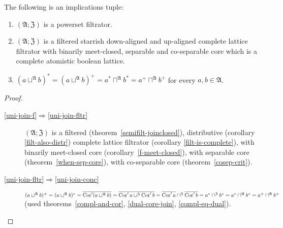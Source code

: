 \begin{thm}
The following is an implications tuple:
\begin{enumerate}
\item \label{uni-join-f}$(\mathfrak{A};\mathfrak{Z})$ is a powerset filtrator.
\item \label{uni-join-fltr}$(\mathfrak{A};\mathfrak{Z})$ is a filtered
starrish down-aligned and up-aligned complete lattice filtrator with binarily meet-closed,
separable and co-separable core which is a complete atomistic boolean lattice.
\item \label{uni-join-conc}$(a\sqcup^{\mathfrak{A}}b)^{\ast}=(a\sqcup^{\mathfrak{A}}b)^{+}=a^{\ast}\sqcap^{\mathfrak{A}}b^{\ast}=a^{+}\sqcap^{\mathfrak{A}}b^{+}$
for every $a,b\in\mathfrak{A}$.
\end{enumerate}
\end{thm}
\begin{proof}
~
\begin{description}
\item [{\ref{uni-join-f}$\Rightarrow$\ref{uni-join-fltr}}] $(\mathfrak{A};\mathfrak{Z})$
is a filtered (theorem~\ref{semifilt-joinclosed}), distributive
(corollary \ref{filt-also-distr}) complete lattice filtrator (corollary
\ref{filt-is-complete}), with binarily meet-closed core (corollary~\ref{f-meet-closed}),
with separable core (theorem~\ref{when-sep-core}), with co-separable core (theorem~\ref{cosep-crit}).
\item [{\ref{uni-join-fltr}$\Rightarrow$\ref{uni-join-conc}}] $(a\sqcup^{\mathfrak{A}}b)^{+}=(a\sqcup^{\mathfrak{A}}b)^{\ast}=\overline{\operatorname{Cor}'(a\sqcup^{\mathfrak{A}}b)}=\overline{\operatorname{Cor}'a\sqcup^{\mathfrak{Z}}\operatorname{Cor}'b}=\overline{\operatorname{Cor}'a}\sqcap^{\mathfrak{Z}}\overline{\operatorname{Cor}'b}=a^{\ast}\sqcap^{\mathfrak{Z}}b^{\ast}=a^{\ast}\sqcap^{\mathfrak{A}}b^{\ast}=a^{+}\sqcap^{\mathfrak{A}}b^{+}$
(used theorems~\ref{compl-and-cor}, \ref{dual-core-join}, \ref{compl-eq-dual}).
\end{description}
\end{proof}

